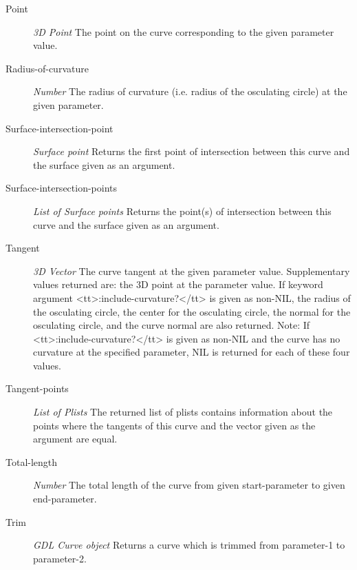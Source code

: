 \documentclass [11pt]{book}
\begin{document}
\begin{itemize}
\begin{description}
\item [Point]
\emph{3D Point} The point on the curve corresponding to the given parameter value.


\item [Radius-of-curvature]
\emph{Number} The radius of curvature (i.e. radius of the osculating circle) at the given parameter.


\item [Surface-intersection-point]
\emph{Surface point} Returns the first point of intersection between this curve and the surface given as an argument.


\item [Surface-intersection-points]
\emph{List of Surface points} Returns the point(s) of intersection between this curve and the surface given as an argument.


\item [Tangent]
\emph{3D Vector} The curve tangent at the given parameter value. Supplementary values returned
are: the 3D point at the parameter value. If keyword argument <tt>:include-curvature?</tt> is given as non-NIL,
the radius of the osculating circle, the center for the osculating circle, the normal for the osculating circle,
and the curve normal are also returned. Note: If <tt>:include-curvature?</tt> is given as non-NIL and the curve
has no curvature at the specified parameter, NIL is returned for each of these four values.


\item [Tangent-points]
\emph{List of Plists} The returned list of plists contains information about the points where the tangents of this curve and the vector given as the argument
are equal.


\item [Total-length]
\emph{Number} The total length of the curve from given start-parameter to given end-parameter.


\item [Trim]
\emph{GDL Curve object} Returns a curve which is trimmed from parameter-1 to parameter-2.


\end{description}








\end{itemize}
\end{document}
